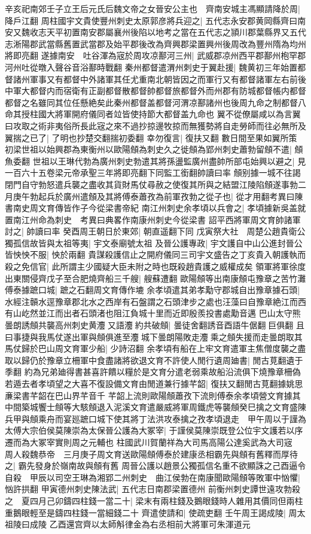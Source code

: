 辛亥祀南郊壬子立王后元氏后魏文帝之女晉安公主也　齊南安城主馮顯請降於周|{
	降戶江翻}
周柱國宇文貴使豐州刺史太原郭彦將兵迎之|{
	五代志永安郡黄岡縣齊曰南安又魏收志天平初置南安郡屬襄州後陷以地考之當在五代志之頴川郡葉縣界又五代志淅陽郡武當縣舊置武當郡及始平郡後改為齊興郡梁置興州後周改為豐州隋為均州將即亮翻}
遂據南安　吐谷渾為宼於周攻凉鄯河三州|{
	武威郡凉州西平郡鄯州枹罕郡河州吐從暾入聲谷音浴鄯時戰翻}
秦州都督遣渭州刺史于翼赴援|{
	魏黄初三年始置都督諸州軍事又有都督中外諸軍其任尤重南北朝皆因之而軍行又有都督諸軍左右前後中軍大都督内而宿衛有正副都督散都督帥都督旅都督外而州郡有防城都督帳内都督都督之名雖同其位任懸絶矣此秦州都督盖都督河渭凉鄯諸州也後周九命之制都督八命其授柱國大將軍開府儀同者竝皆使持節大都督盖九命也}
翼不從僚屬咸以為言翼曰攻取之術非夷俗所長此宼之來不過抄掠邊牧掠而無獲勢將自走勞師而往必無所及翼揣之已了|{
	了明也抄楚交翻揣初委翻}
幸勿復言|{
	復扶又翻}
數日間至果如翼所策　初梁世祖以始興郡為東衡州以歐陽頠為刺史久之徙頠為郢州刺史蕭勃留頠不遣|{
	頠魚委翻}
世祖以王琳代勃為廣州刺史勃遣其將孫盪監廣州盡帥所部屯始興以避之|{
	見一百六十五卷梁元帝承聖三年將即亮翻下同監工銜翻帥讀曰率}
頠别據一城不往謁閉門自守勃怒遣兵襲之盡收其貨財馬仗尋赦之使復其所與之結盟江陵陷頠遂事勃二月庚午勃起兵於廣州遣頠及其將傅泰蕭孜為前軍孜勃之從子也|{
	從才用翻考異曰陳書南史周文育傳皆作子今從梁書帝紀}
南江州刺史余孝頃以兵會之|{
	孝頃據新吳盖就置南江州命為刺史　考異曰典畧作南康州刺史今從梁書}
詔平西將軍周文育帥諸軍討之|{
	帥讀曰率}
癸酉周王朝日於東郊|{
	朝直遥翻下同}
戊寅祭大社　周楚公趙貴衛公獨孤信故皆與太祖等夷|{
	宇文泰廟號太祖}
及晉公護專政|{
	宇文護自中山公進封晉公}
皆怏怏不服|{
	怏於兩翻}
貴謀殺護信止之開府儀同三司宇文盛告之丁亥貴入朝護執而殺之免信官|{
	此所謂主少國疑大臣未附之時也既殺趙貴護之威權成矣}
領軍將軍徐度出東關侵齊戊子至合肥燒齊船三千艘|{
	艘蘇遭翻}
歐陽頠等出南康頠屯豫章之苦竹灘傅泰據蹠口城|{
	蹠之石翻周文育傳作塶}
余孝頃遣其弟孝勱守郡城自出豫章據石頭|{
	水經注贑水逕豫章郡北水之西岸有石盤謂之石頭津步之處也汪藻曰自豫章絶江而西有山屹然並江而出者石頭渚也阻江負城十里而近即殷羨投書處勱音邁}
巴山太守熊曇朗誘頠共襲高州刺史黄灋又語灋約共破頠|{
	曇徒舍翻誘音酉語牛倨翻巨俱翻}
且曰事捷與我馬仗遂出軍與頠俱進至灋城下曇朗陽敗走灋乘之頠失援而走曇朗取其馬仗歸於巴山周文育軍少船|{
	少詩沼翻}
余孝頃有船在上牢文育遣軍主焦僧度襲之盡取以歸仍於豫章立柵軍中食盡諸將欲退文育不許使人閒行遺周廸書|{
	閒古莧翻遺于季翻}
約為兄弟廸得書甚喜許饋以糧於是文育分遣老弱乘故船沿流俱下燒豫章柵偽若遁去者孝頃望之大喜不復設備文育由閒道兼行據芊韶|{
	復扶又翻閒古莧翻據姚思亷梁書芊韶在巴山界芊音千}
芊韶上流則歐陽頠蕭孜下流則傅泰余孝頃營文育據其中間築城饗士頠等大駭頠退入泥溪文育遣嚴威將軍周鐵虎等襲頠癸巳擒之文育盛陳兵甲與頠乘舟而宴廵蹠口城下使其將丁法洪攻泰擒之孜孝頃退走　甲午周以于謹為太傅大宗伯侯莫陳崇為太保晉公護為大冢宰|{
	于謹侯莫陳崇既登公位宇文護若以序遷而為大冢宰實則周之元輔也}
柱國武川賀蘭祥為大司馬高陽公達奚武為大司宼　周人殺魏恭帝　三月庚子周文育送歐陽頠傅泰於建康丞相霸先與頠有舊釋而厚待之|{
	霸先發身於嶺南故與頠有舊}
周晉公護以趙景公獨孤信名重不欲顯誅之己酉逼令自殺　甲辰以司空王琳為湘郢二州刺史　曲江侯勃在南康聞歐陽頠等敗軍中忷懼|{
	忷許拱翻}
甲寅德州刺史陳法武|{
	五代志日南郡梁置德州}
前衡州刺史譚世遠攻勃殺之　夏四月己卯鑄四柱錢一當二十|{
	梁末有兩柱錢及鵝眼錢時人雜用其價同但兩柱重鵝眼輕至是鑄四柱錢一當細錢二十}
齊遣使請和|{
	使疏吏翻}
壬午周王謁成陵|{
	周太祖陵曰成陵}
乙酉還宫齊以太師斛律金為右丞相前大將軍可朱渾道元

